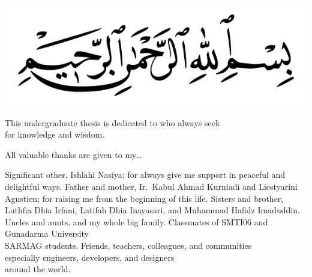 
\clearpage
\vspace*{\fill}
\begin{minipage}{.8\textwidth}
\begin{center}


\includegraphics[width=\textwidth]{include/basmala}

\hfill

\noindent This undergraduate thesis is dedicated to who always seek\\for knowledge and wisdom.

\hfill

\noindent All valuable thanks are given to my\ldots

\begin{itemize}
\idia Significant other, Ishlahi Nasiya; for always give me support in peaceful and delightful ways.
\idia Father and mother, Ir.\ Kabul Ahmad Kurniadi and Liestyarini Agustien; for raising me from the beginning of this life.
\idia Sisters and brother, Luthfia Dhia Irfani, Latifah Dhia Inayasari, and Muhammad Hafidz Imaduddin.
\idia Uncles and aunts, and my whole big family.
\idia Classmates of SMTI$06$ and Gunadarma University\\SARMAG students.
\idia Friends, teachers, colleagues, and communities\\especially engineers, developers, and designers\\around the world.
\end{itemize}

\end{center}
\end{minipage}
\vfill %
\clearpage

